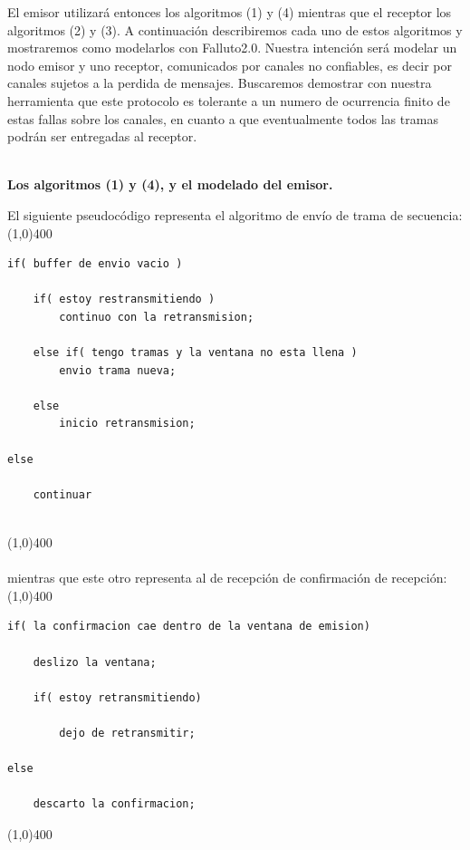 \documentclass[titlepage, 12pt]{book}
\begin{document}
El emisor utilizar\'a entonces los algoritmos (1) y (4) mientras que el receptor los algoritmos (2) y (3). A continuaci\'on describiremos cada uno de estos algoritmos y mostraremos como modelarlos con Falluto2.0. Nuestra intenci\'on ser\'a modelar un nodo emisor y uno receptor, comunicados por canales no confiables, es decir por canales sujetos a la perdida de mensajes. Buscaremos demostrar con nuestra herramienta que este protocolo es tolerante a un numero de ocurrencia finito de estas fallas sobre los canales, en cuanto a que eventualmente todos las tramas podr\'an ser entregadas al receptor.\\\\

\begin{center}
\textbf{\large Los algoritmos (1) y (4), y el modelado del emisor.}
\end{center}

El siguiente pseudoc\'odigo representa el algoritmo de env\'io de trama de secuencia:\\

\noindent \line(1,0){400}
\begin{verbatim}
if( buffer de envio vacio )

    if( estoy restransmitiendo )
        continuo con la retransmision;
            
    else if( tengo tramas y la ventana no esta llena )
        envio trama nueva;

    else 
        inicio retransmision;

else
        
    continuar   		
        
\end{verbatim}
\noindent \line(1,0){400}\\\\

mientras que este otro representa al de recepci\'on de confirmaci\'on de recepci\'on:\\

\noindent \line(1,0){400}
\begin{verbatim}
if( la confirmacion cae dentro de la ventana de emision)
    
    deslizo la ventana;

    if( estoy retransmitiendo)

        dejo de retransmitir;

else

    descarto la confirmacion;
\end{verbatim}
\noindent \line(1,0){400}\\\\
\end{document}
